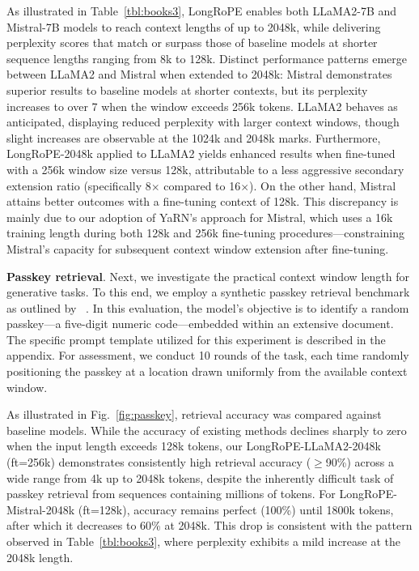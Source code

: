 As illustrated in Table~\ref{tbl:books3}, LongRoPE enables both LLaMA2-7B and Mistral-7B models to reach context lengths of up to 2048k, while delivering perplexity scores that match or surpass those of baseline models at shorter sequence lengths ranging from 8k to 128k. Distinct performance patterns emerge between LLaMA2 and Mistral when extended to 2048k: Mistral demonstrates superior results to baseline models at shorter contexts, but its perplexity increases to over 7 when the window exceeds 256k tokens. LLaMA2 behaves as anticipated, displaying reduced perplexity with larger context windows, though slight increases are observable at the 1024k and 2048k marks. Furthermore, LongRoPE-2048k applied to LLaMA2 yields enhanced results when fine-tuned with a 256k window size versus 128k, attributable to a less aggressive secondary extension ratio (specifically 8$\times$ compared to 16$\times$). On the other hand, Mistral attains better outcomes with a fine-tuning context of 128k. This discrepancy is mainly due to our adoption of YaRN's approach for Mistral, which uses a 16k training length during both 128k and 256k fine-tuning procedures—constraining Mistral's capacity for subsequent context window extension after fine-tuning.

\textbf{Passkey retrieval}. Next, we investigate the practical context window length for generative tasks. To this end, we employ a synthetic passkey retrieval benchmark as outlined by ~\cite{passkey}. In this evaluation, the model's objective is to identify a random passkey—a five-digit numeric code—embedded within an extensive document. The specific prompt template utilized for this experiment is described in the appendix. For assessment, we conduct 10 rounds of the task, each time randomly positioning the passkey at a location drawn uniformly from the available context window.

As illustrated in Fig.~\ref{fig:passkey}, retrieval accuracy was compared against baseline models. While the accuracy of existing methods declines sharply to zero when the input length exceeds 128k tokens, our LongRoPE-LLaMA2-2048k (ft=256k) demonstrates consistently high retrieval accuracy ($\ge$90\%) across a wide range from 4k up to 2048k tokens, despite the inherently difficult task of passkey retrieval from sequences containing millions of tokens. For LongRoPE-Mistral-2048k (ft=128k), accuracy remains perfect (100\%) until 1800k tokens, after which it decreases to 60\% at 2048k. This drop is consistent with the pattern observed in Table~\ref{tbl:books3}, where perplexity exhibits a mild increase at the 2048k length.

